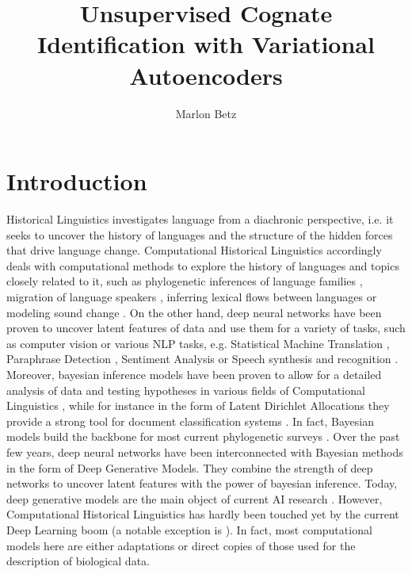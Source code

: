 \documentclass[6pt]{article}
\title{Unsupervised Cognate Identification with Variational Autoencoders}
\author{Marlon Betz}
\begin{document}
\maketitle
\newpage
\tableofcontents
\newpage

\section{Introduction}

Historical Linguistics investigates language from a diachronic perspective, i.e. it seeks to uncover the history of languages and the structure of the hidden forces that drive language change.  Computational Historical Linguistics accordingly deals with computational methods to explore the history of languages and topics closely related to it, such as phylogenetic inferences of language families \citep{bouckaert2012mapping}, migration of language speakers \citep{gray2009language}, inferring lexical flows between languages \citep{dellert2015uralic} or modeling sound change \citep{bouchard2013automated}.  
On the other hand, deep neural networks have been proven to uncover latent features of data and use them for a variety of tasks, such as computer vision or various NLP tasks, e.g. Statistical Machine Translation \citep{zhang2014bilingually,lauly2014autoencoder}, Paraphrase Detection \citep{socher2011dynamic}, Sentiment Analysis \citep{socher2013recursive} or Speech synthesis  and recognition \citep{hinton2012deep,zen2014deep}. 
Moreover, bayesian inference models have been proven to allow for a detailed analysis of data and testing hypotheses in various fields of Computational Linguistics \citep{crocker2010computational,chater2006probabilistic}, while for instance in the form of Latent Dirichlet Allocations they provide a strong tool for document classification systems \citep{blei2003latent}. In fact, Bayesian models build the backbone for most current phylogenetic surveys \citep{gray2009language,bouckaert2012mapping,bouchard2013automated}.
Over the past few years, deep neural networks have been interconnected with Bayesian methods in the form of Deep Generative Models. They combine the strength of deep networks to uncover latent features with the power of bayesian inference. Today, deep generative models are the main object of current AI research \citep[p. 654]{Goodfellow-et-al-2016-Book}. 
 However, Computational Historical Linguistics has hardly been touched yet by the current Deep Learning boom (a notable exception is \cite{rama2016siamese}). 
 In fact, most computational models here are either adaptations or direct copies of those used for the description of biological data. 
\end{document}
